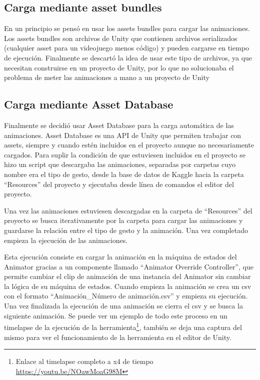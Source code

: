 \subsection{Carga mediante asset bundles}
En un principio se pensó en usar los assets bundles para cargar las animaciones.
Los assets bundles son archivos de Unity que contienen archivos serializados (cualquier asset para un videojuego menos código) y pueden cargarse en tiempo de ejecución.
Finalmente se descartó la idea de usar este tipo de archivos, ya que necesitan construirse en un proyecto de Unity, por lo que no solucionaba el problema de meter las animaciones a mano a un proyecto de Unity

\subsection{Carga mediante Asset Database}
Finalmente se decidió usar Asset Database para la carga automática de las animaciones.
Asset Database es una API de Unity que permiten trabajar con assets, siempre y cuando estén incluidos en el proyecto aunque no necesariamente cargados.
Para suplir la condición de que estuviesen incluidos en el proyecto se hizo un script que descargaba las animaciones, separadas por carpetas cuyo nombre era el tipo de gesto, desde la base de datos de Kaggle hacia la carpeta ``Resources'' del proyecto y ejecutaba desde línea de comandos el editor del proyecto.

Una vez las animaciones estuviesen descargadas en la carpeta de ``Resources'' del proyecto se busca iterativamente por la carpeta para cargar las animaciones y guardarse la relación entre el tipo de gesto y la animación.
Una vez completado empieza la ejecución de las animaciones.

Esta ejecución consiste en cargar la animación en la máquina de estados del \gls{Animator} gracias a un componente llamado ``Animator Override Controller'', que permite cambiar el clip de animación de una instancia del \gls{Animator} sin cambiar la lógica de su máquina de estados.
Cuando empieza la animación se crea un \gls{csv} con el formato ``Animación\_Número de animación.csv'' y empieza su ejecución.
Una vez finalizada la ejecución de una animación se cierra el \gls{csv} y se busca la siguiente animación. Se puede ver un ejemplo de todo este proceso en un timelapse de la ejecución de la herramienta\footnote{Enlace al timelapse completo a x4 de tiempo \url{https://youtu.be/NOawMoaG98M}}, también se deja una captura del mismo para ver el funcionamiento de la herramienta en el editor de Unity.

